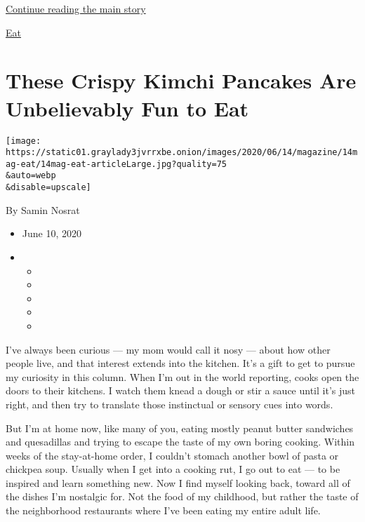 \protect\hyperlink{after-sponsor}{Continue reading the main story}

\href{/column/magazine-eat}{Eat}

\hypertarget{these-crispy-kimchi-pancakes-are-unbelievably-fun-to-eat}{%
\section{These Crispy Kimchi Pancakes Are Unbelievably Fun to
Eat}\label{these-crispy-kimchi-pancakes-are-unbelievably-fun-to-eat}}

\texttt{[image: https://static01.graylady3jvrrxbe.onion/images/2020/06/14/magazine/14mag-eat/14mag-eat-articleLarge.jpg?quality=75\\\&auto=webp\\\&disable=upscale]}

By Samin Nosrat

\begin{itemize}
\item
  June 10, 2020
\item
  \begin{itemize}
  \item
  \item
  \item
  \item
  \item
  \end{itemize}
\end{itemize}

I've always been curious --- my mom would call it nosy --- about how
other people live, and that interest extends into the kitchen. It's a
gift to get to pursue my curiosity in this column. When I'm out in the
world reporting, cooks open the doors to their kitchens. I watch them
knead a dough or stir a sauce until it's just right, and then try to
translate those instinctual or sensory cues into words.

But I'm at home now, like many of you, eating mostly peanut butter
sandwiches and quesadillas and trying to escape the taste of my own
boring cooking. Within weeks of the stay-at-home order, I couldn't
stomach another bowl of pasta or chickpea soup. Usually when I get into
a cooking rut, I go out to eat --- to be inspired and learn something
new. Now I find myself looking back, toward all of the dishes I'm
nostalgic for. Not the food of my childhood, but rather the taste of the
neighborhood restaurants where I've been eating my entire adult life.

